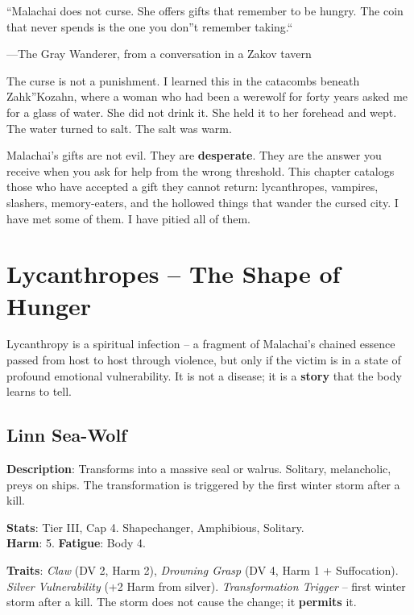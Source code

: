 
\epigraph{``Malachai does not curse. She offers gifts that remember to be hungry. The coin that never spends is the one you don''t remember taking.``}{---The Gray Wanderer, from a conversation in a Zakov tavern}

The curse is not a punishment. I learned this in the catacombs beneath Zahk''Kozahn, where a woman who had been a werewolf for forty years asked me for a glass of water. She did not drink it. She held it to her forehead and wept. The water turned to salt. The salt was warm.

Malachai's gifts are not evil. They are \textbf{desperate}. They are the answer you receive when you ask for help from the wrong threshold. This chapter catalogs those who have accepted a gift they cannot return: lycanthropes, vampires, slashers, memory-eaters, and the hollowed things that wander the cursed city. I have met some of them. I have pitied all of them.

\section*{Lycanthropes -- The Shape of Hunger}

\noindent Lycanthropy is a spiritual infection -- a fragment of Malachai's chained essence passed from host to host through violence, but only if the victim is in a state of profound emotional vulnerability. It is not a disease; it is a \textbf{story} that the body learns to tell.

\subsection*{Linn Sea-Wolf}

\noindent\textbf{Description}: Transforms into a massive seal or walrus. Solitary, melancholic, preys on ships. The transformation is triggered by the first winter storm after a kill.

\noindent\textbf{Stats}: Tier III, Cap 4. Shapechanger, Amphibious, Solitary.\\
\textbf{Harm}: 5. \textbf{Fatigue}: Body 4.

\noindent\textbf{Traits}: 
\emph{Claw} (DV 2, Harm 2), \emph{Drowning Grasp} (DV 4, Harm 1 + Suffocation). \emph{Silver Vulnerability} (+2 Harm from silver). \emph{Transformation Trigger} -- first winter storm after a kill. The storm does not cause the change; it \textbf{permits} it.

